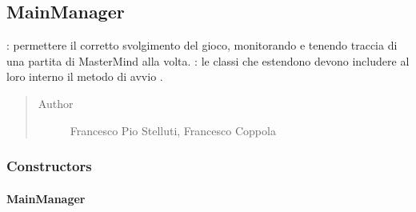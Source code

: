 \documentclass[letterpaper,10pt,italian,openany,oneside]{sphinxmanual}
\begin{document}
\begin{fulllineitems}
\label{\detokenize{source/it/unicam/cs/pa/mastermind/gamecore/GlobalSettings:it.unicam.cs.pa.mastermind.gamecore.GlobalSettings.getMakers()}}
\end{fulllineitems}



\subsection{MainManager}
\label{\detokenize{source/it/unicam/cs/pa/mastermind/gamecore/MainManager:mainmanager}}\label{\detokenize{source/it/unicam/cs/pa/mastermind/gamecore/MainManager::doc}}

\begin{fulllineitems}
\label{\detokenize{source/it/unicam/cs/pa/mastermind/gamecore/MainManager:it.unicam.cs.pa.mastermind.gamecore.MainManager}}
: permettere il corretto svolgimento del gioco, monitorando e tenendo traccia di una partita di MasterMind alla volta. : le classi che estendono  devono includere al loro interno il metodo di avvio .
\begin{quote}\begin{description}
\item[{Author}] \leavevmode
Francesco Pio Stelluti, Francesco Coppola

\end{description}\end{quote}

\end{fulllineitems}



\subsubsection{Constructors}
\label{\detokenize{source/it/unicam/cs/pa/mastermind/gamecore/MainManager:constructors}}

\paragraph{MainManager}
\label{\detokenize{source/it/unicam/cs/pa/mastermind/gamecore/MainManager:id1}}
\end{document}
